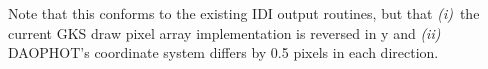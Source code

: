 \vspace{10mm}

Note that this conforms to the existing IDI output routines, but that  {\em
(i)}\/~the current GKS draw pixel array implementation is reversed in y and 
{\em (ii)}\/~ DAOPHOT's coordinate system differs by 0.5 pixels in each
direction.


                                                                                                                                                                        